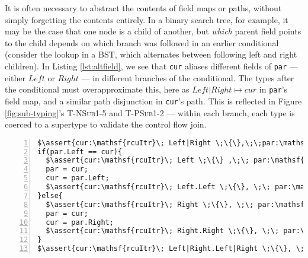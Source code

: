 It is often necessary to abstract the contents of field maps or paths, without simply forgetting the contents entirely.  In a binary search tree, for example, it may be the case that one node is a child of another, but \emph{which} parent field points to the child depends on which branch was followed in an earlier conditional (consider the lookup in a BST, which alternates between following left and right children).
In Listing \ref{lst:altfield}, we see that \texttt{cur} aliases different fields of \texttt{par} --- either $Left$ or $Right$ --- in different branches of the conditional.
The types after the conditional must overapproximate this, here as $Left|Right\mapsto cur$ in \texttt{par}'s field map, and a similar path disjunction in \texttt{cur}'s path.
This is reflected in Figure \ref{fig:sub-typing}'s \textsc{T-NSub1-5} and \textsc{T-PSub1-2} --- within each branch, each type is coerced to a supertype to validate the control flow join.
\begin{lstlisting}[caption={Choosing fields to read},label={lst:altfield},numbersep=1pt,xrightmargin=-1cm,xleftmargin=0.1\textwidth, numbers=left, numbersep=5pt,basicstyle=\scriptsize\ttfamily]
$\assert{cur:\mathsf{rcuItr}\; Left|Right \;\{\},\;\;par:\mathsf{rcuItr}\;  \epsilon \;\{Left|Right\mapsto cur\}}$
if(par.Left == cur){
  $\assert{cur:\mathsf{rcuItr}\; Left \;\{\} ,\;\; par:\mathsf{rcuItr}\;  \epsilon \;\{Left\mapsto cur\}}$
  par = cur;
  cur = par.Left;
  $\assert{cur:\mathsf{rcuItr}\; Left.Left \;\{\}, \;\; par:\mathsf{rcuItr}\;  Left \;\{Left\mapsto cur\}}$
}else{
  $\assert{cur:\mathsf{rcuItr}\; Right \;\{\}, \;\; par:\mathsf{rcuItr}\;  \epsilon \;\{Right\mapsto cur\}}$
  par = cur;
  cur = par.Right;
  $\assert{cur:\mathsf{rcuItr}\; Right.Right \;\{\}, \;\; par:\mathsf{rcuItr}\;  Right \;\{Right\mapsto cur\}}$
}
$\assert{cur:\mathsf{rcuItr}\; Left|Right.Left|Right \;\{\}, \;\; par:\mathsf{rcuItr}\;  Left|Right \;\{Left|Right\mapsto cur\}}$
\end{lstlisting}

